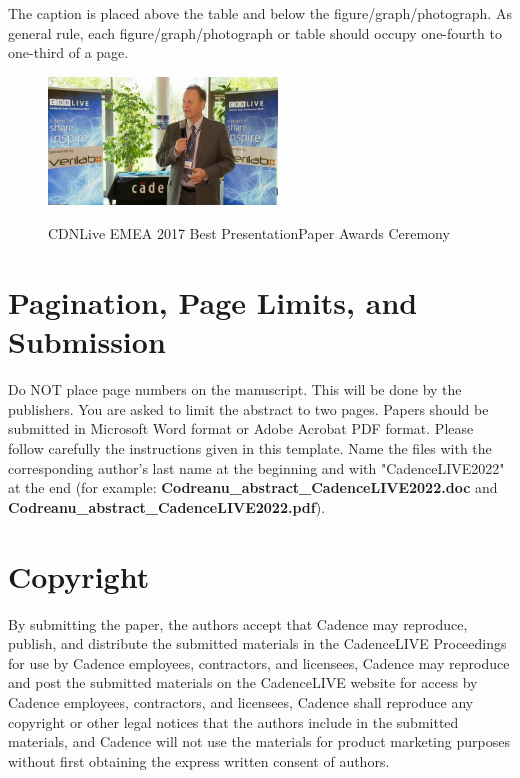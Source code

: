\documentclass[a4paper,10pt]{article}
\begin{document}
The caption is placed above the table and below the figure/graph/photograph. As
general rule, each figure/graph/photograph or table should occupy one-fourth to
one-third of a page. 

\begin{figure}[!h]
    \centering
    \includegraphics[width=2.3984in,height=1.3437in]{./fig/cadencelive-ceremony.jpg}
    \label{fig:ceremony}
    \caption{CDNLive EMEA 2017 Best PresentationPaper Awards Ceremony}
\end{figure}

\section*{Pagination, Page Limits, and Submission}

Do NOT place page numbers on the manuscript. This will be done by the
publishers. You are asked to limit the abstract to two pages. Papers should be
submitted in Microsoft Word format or Adobe Acrobat PDF format. Please follow
carefully the instructions given in this template. Name the files with the
corresponding author’s last name at the beginning and with "CadenceLIVE2022" at
the end (for example: \textbf{Codreanu\_abstract\_CadenceLIVE2022.doc} and
\textbf{Codreanu\_abstract\_CadenceLIVE2022.pdf}).

\section*{Copyright}

By submitting the paper, the authors accept that Cadence may reproduce,
publish, and distribute the submitted materials in the CadenceLIVE Proceedings
for use by Cadence employees, contractors, and licensees, Cadence may reproduce
and post the submitted materials on the CadenceLIVE website for access by
Cadence employees, contractors, and licensees, Cadence shall reproduce any
copyright or other legal notices that the authors include in the submitted
materials, and Cadence will not use the materials for product marketing
purposes without first obtaining the express written consent of authors. 
\end{document}
